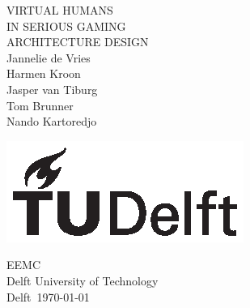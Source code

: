 \documentclass[]{article}
\begin{document}
	
	\begin{titlepage}
		\centering
		
		{\Huge VIRTUAL HUMANS}\\[1em]
		{\huge IN SERIOUS GAMING}\\[1em]
		{\Large ARCHITECTURE DESIGN}\\[2em]
		{Jannelie de Vries}\\
		{Harmen Kroon}\\
		{Jasper van Tiburg}\\
		{Tom Brunner}\\
		{Nando Kartoredjo}
		
		\vfill
		
		\includegraphics{TU_Delft_logo_Black.eps}
		
		EEMC\\
		Delft University of Technology\\
		Delft\
		\today		
	\end{titlepage}
	
	\tableofcontents
	\newpage
	
	
	
	

	
\end{document}

